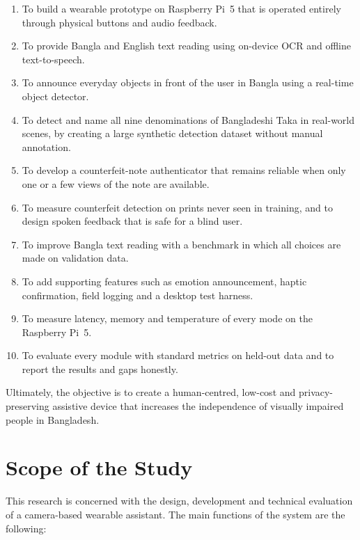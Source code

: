 \begin{enumerate}[noitemsep]
    \item To build a wearable prototype on Raspberry Pi~5 that is operated entirely through physical buttons and audio feedback.
    \item To provide Bangla and English text reading using on-device OCR and offline text-to-speech.
    \item To announce everyday objects in front of the user in Bangla using a real-time object detector.
    \item To detect and name all nine denominations of Bangladeshi Taka in real-world scenes, by creating a large synthetic detection dataset without manual annotation.
    \item To develop a counterfeit-note authenticator that remains reliable when only one or a few views of the note are available.
    \item To measure counterfeit detection on prints never seen in training, and to design spoken feedback that is safe for a blind user.
    \item To improve Bangla text reading with a benchmark in which all choices are made on validation data.
    \item To add supporting features such as emotion announcement, haptic confirmation, field logging and a desktop test harness.
    \item To measure latency, memory and temperature of every mode on the Raspberry Pi~5.
    \item To evaluate every module with standard metrics on held-out data and to report the results and gaps honestly.
\end{enumerate}

Ultimately, the objective is to create a human-centred, low-cost and privacy-preserving assistive device that increases the independence of visually impaired people in Bangladesh.

\section{Scope of the Study}
\label{sec:Scope of the Study}

This research is concerned with the design, development and technical evaluation of a camera-based wearable assistant. The main functions of the system are the following:


